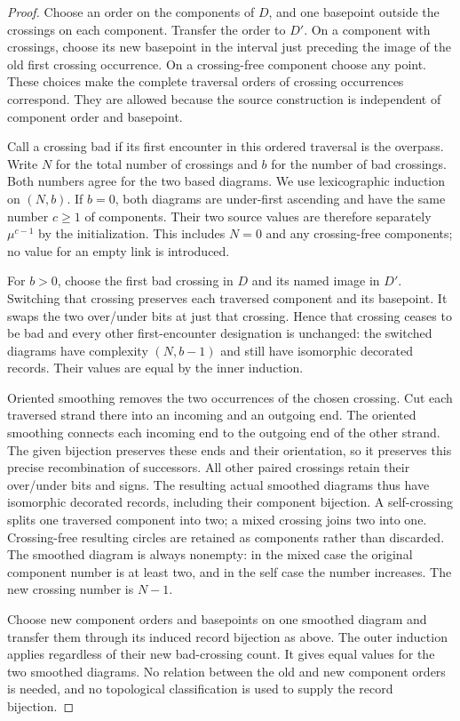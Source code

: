 \begin{proof}
Choose an order on the components of $D$, and one basepoint outside the
crossings on each component. Transfer the order to $D'$. On a component
with crossings, choose its new basepoint in the interval just preceding
the image of the old first crossing occurrence. On a crossing-free
component choose any point. These choices make the complete traversal
orders of crossing occurrences correspond. They are allowed because the
source construction is independent of component order and basepoint.

Call a crossing bad if its first encounter in this ordered traversal is
the overpass. Write $N$ for the total number of crossings and $b$ for the
number of bad crossings. Both numbers agree for the two based diagrams.
We use lexicographic induction on $(N,b)$. If $b=0$, both diagrams are
under-first ascending and have the same number $c\geq1$ of components.
Their two source values are therefore separately $\mu^{c-1}$ by the
initialization. This includes $N=0$ and any crossing-free components;
no value for an empty link is introduced.

For $b>0$, choose the first bad crossing in $D$ and its named image in
$D'$. Switching that crossing preserves each traversed component and its
basepoint. It swaps the two over/under bits at just that crossing.
Hence that crossing ceases to be bad and every other first-encounter
designation is unchanged: the switched diagrams have complexity
$(N,b-1)$ and still have isomorphic decorated records. Their values
are equal by the inner induction.

Oriented smoothing removes the two occurrences of the chosen crossing.
Cut each traversed strand there into an incoming and an outgoing end.
The oriented smoothing connects each incoming end to the outgoing end
of the other strand. The given bijection preserves these ends and their
orientation, so it preserves this precise recombination of successors.
All other paired crossings retain their over/under bits and signs.
The resulting actual smoothed diagrams thus have isomorphic decorated
records, including their component bijection. A self-crossing splits
one traversed component into two; a mixed crossing joins two into one.
Crossing-free resulting circles are retained as components rather than
discarded. The smoothed diagram is always nonempty: in the mixed case
the original component number is at least two, and in the self case
the number increases. The new crossing number is $N-1$.

Choose new component orders and basepoints on one smoothed diagram and
transfer them through its induced record bijection as above. The outer
induction applies regardless of their new bad-crossing count. It gives
equal values for the two smoothed diagrams. No relation between the old
and new component orders is needed, and no topological classification
is used to supply the record bijection.


\end{proof}
